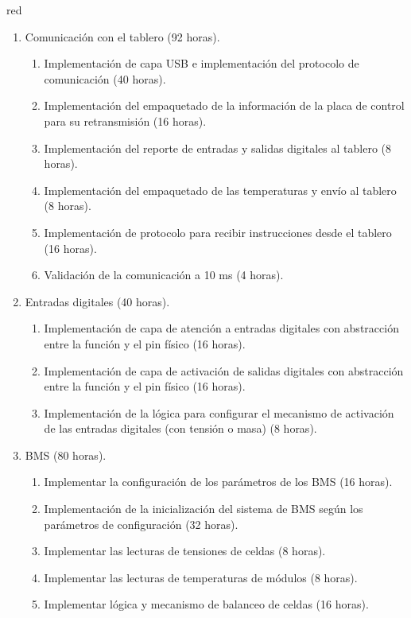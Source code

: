 \documentclass[
11pt, %
codirector, %
]{charter}
\begin{document}
\begin{consigna}{red}

	\begin{enumerate}
		\item Comunicación con el tablero (92 horas).
		      \begin{enumerate}
			      \item Implementación de capa USB e implementación del protocolo de comunicación (40 horas).
			      \item Implementación del empaquetado de la información de la placa de control para su retransmisión (16 horas).
			      \item Implementación del reporte de entradas y salidas digitales al tablero (8 horas).
			      \item Implementación del empaquetado de las temperaturas y envío al tablero (8 horas).
			      \item Implementación de protocolo para recibir instrucciones desde el tablero (16 horas).
			      \item Validación de la comunicación a 10 ms (4 horas).
		      \end{enumerate}
		\item Entradas digitales (40 horas).
		      \begin{enumerate}
			      \item Implementación de capa de atención a entradas digitales con abstracción entre la función y el pin físico (16 horas).
			      \item Implementación de capa de activación de salidas digitales con abstracción entre la función y el pin físico (16 horas).
			      \item Implementación de la lógica para configurar el mecanismo de activación de las entradas digitales (con tensión o masa) (8 horas).
		      \end{enumerate}
		\item BMS (80 horas).
		      \begin{enumerate}
			      \item Implementar la configuración de los parámetros de los BMS (16 horas).
			      \item Implementación de la inicialización del sistema de BMS según los parámetros de configuración (32 horas).
			      \item Implementar las lecturas de tensiones de celdas (8 horas).
			      \item Implementar las lecturas de temperaturas de módulos (8 horas).
			      \item Implementar lógica y mecanismo de balanceo de celdas (16 horas).

\end{enumerate}
\end{enumerate}
\end{consigna}
\end{document}
